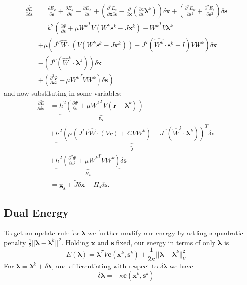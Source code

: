 \documentclass[letterpaper,12pt]{article}
\theoremstyle{remark}
\newcommand{\x}{\mathbf{x}}
\newcommand{\C}{\mathbf{c}}
\newcommand{\s}{\mathbf{s}}
\newcommand{\la}{\mathbf{\lambda}}
\newcommand{\dx}{\delta \x}
\newcommand{\ds}{\delta \s}
\newcommand{\dl}{\delta \la}
\newcommand{\El}{E_\Lambda}
\newcommand{\Hs}{ {H_\s} }
\newcommand{\gs}{ {\mathbf{g}_\s} }
\newcommand{\res}{ {\mathbf{r}} }
\newcommand{\Jt}{ {\tilde{J}} }
\begin{document}
\begin{equation}
\begin{split}
\frac{\partial \tilde{E}}{\partial \ds} &=
 \frac{\partial E_\Psi}{\partial \s} + \frac{\partial E_\kappa}{\partial \s} -  \frac{\partial \El}{\partial \s}
  + \left( \frac{\partial^2 E_\kappa}{\partial \x \partial \s}
  - \frac{\partial}{\partial \x} \left(\frac{\partial \C}{\partial \s} \la^k\right) \right)\dx
    + \left(\frac{\partial^2 E_\Psi}{\partial \s^2}
    + \frac{\partial^2 E_\kappa}{\partial \s^2} \right) \ds \\
&=  h^2 \left( \frac{\partial \Psi}{\partial \s} + \mu {W^k}^T V (W^k\s^k - J\x^k) - {W^k}^TV\la^k \right. \\
&+ \mu \left( 
	J^T \hat{W} \cdot \left(V (W^k\s^k - J\x^k)	\right)
  + J^T(\hat{W^k}\cdot\s^k - I)  V W^k
   \right) \dx \\
&- \left( J^T(\hat{W}^k\cdot \la^k) \right) \dx \\
&+ \left. \left(\frac{\partial^2 \Psi}{\partial \s^2} + \mu{W^k}^T V {W^k} \right) \ds \right),
\end{split}
\end{equation}
and now substituting in some variables:
\begin{equation}
\begin{split}
\frac{\partial \tilde{E}}{\partial \ds} 
&= \underbrace{h^2 \left( \frac{\partial \Psi}{\partial \s} + \mu {W^k}^T V (\res - \la^k) \right)}_\gs \\
&+ \underbrace{h^2 \left( \mu \left(
	J^T V \hat{W} \cdot \left(V \res	\right)
  + G V W^k \right)
   - J^T(\hat{W}^k\cdot \la^k) \right)^T}_{\Jt} \dx \\
&+ \underbrace{h^2 \left(\frac{\partial^2 \Psi}{\partial \s^2} + \mu{W^k}^T V {W^k} \right)}_\Hs \ds \\
&= \gs + \Jt \dx + \Hs \ds.
\end{split}
\end{equation}


\subsection{Dual Energy}
To get an update rule for $\la$ we further modify our energy by adding a quadratic penalty $\frac{1}{2}||\la - \la^k||^2$. Holding $\x$ and $\s$ fixed, our energy in terms of only $\la$ is
\begin{equation}
E(\la) = \la^T V \C (\x^k, \s^k) + \frac{1}{2\kappa} ||\la - \la^k||_V^2
\end{equation}
For $\la = \la^k + \dl$, and differentiating with respect to $\dl$ we have
\begin{equation}
\dl = -\kappa \C(\x^k,\s^k)
\end{equation}
\end{document}
